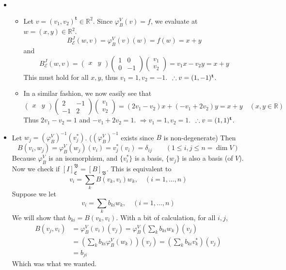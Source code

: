 \documentclass[12pt]{report}
\newcommand{\numl}[1]{\item[\large\textbf{\sffamily #1}]}
\newcommand{\num}[1]{\item[\textbf{\sffamily #1}]}
\newcommand{\mf}[1]{\mathfrak{#1}}
\newcommand{\mc}[1]{\mathcal{#1}}
\newcommand{\bb}[1]{\mathbb{#1}}
\newcommand{\trans}{^{\mathrm{\mathbf{t}}}}
\newcommand{\inv}{^{-1}}
\renewcommand{\inv}{^{-1}}
\begin{document}
\begin{itemize}
\numl{13.8.7}
	\begin{itemize}
		\num{(가)} Let $v = (v_1, v_2)\trans \in \bb{R}^2$. Since $\varphi_B^V(v) = f$, we evaluate at $w = (x, y)\in \bb{R}^2$. $$B_\mc{E}^J(w, v)=\varphi_B^V(v)(w) = f(w) = x+y$$ and $$B_\mc{E}^J(w, v) = \begin{pmatrix}
			x & y
		\end{pmatrix} \begin{pmatrix}
		1 & 0 \\ 0 & -1
		\end{pmatrix} \begin{pmatrix}
		v_1\\v_2
		\end{pmatrix} = v_1x - v_2y = x+ y$$This must hold for all $x, y$, thus $v_1 = 1, v_2 = -1$. $~\hfill \therefore v = (1, -1)\trans$.
		\num{(나)} In a similar fashion, we now easily see that $$\begin{pmatrix}
		x & y
		\end{pmatrix} \begin{pmatrix}
		2 & -1 \\ -1 & 2
		\end{pmatrix} \begin{pmatrix}
		v_1\\v_2
		\end{pmatrix} = (2v_1-v_2)x + (-v_1+2v_2)y = x+ y \quad(x, y\in \bb{R})$$
		Thus $2v_1 -v_2 = 1$ and $-v_1+2v_2=1$. $\Rightarrow v_1 = 1, v_2 = 1$. $~\hfill \therefore v=(1, 1)\trans$.
	\end{itemize}

\numl{13.8.8} Let $w_j = (\varphi_B^V)\inv(v_j^*)$. ($(\varphi_B^V)\inv$ exists since $B$ is non-degenerate) Then $$B(v_i, w_j) = \varphi_B^V(w_j)(v_i) = v_j^*(v_i) = \delta_{ij} \qquad (1\leq i, j\leq n=\dim V)$$ Because $\varphi_B^V$ is an isomorphism, and $\{v_i^*\}$ is a basis, $\{w_j\}$ is also a basis (of $V$). \\Now we check if $\left[I\right]_\mf{C}^\mf{B} = \left[B\right]_{\mf{B}}$. This is equivalent to $$v_i = \sum_k B(v_k, v_i)w_k, \quad (i = 1, \dots, n)$$ Suppose we let $$v_i = \sum_k b_{ki}w_k, \quad (i = 1, \dots, n)$$ We will show that $b_{ki} = B(v_k, v_i)$. With a bit of calculation, for all $i, j$, $$\begin{aligned}B(v_j, v_i) &= \varphi_B^V(v_i)(v_j) = \varphi_B^V\left(\sum_k b_{ki}w_k\right)\left(v_j\right) \\&= \left(\sum_k b_{ki}\varphi_B^V(w_k)\right)(v_j)
= \left(\sum_k b_{ki}v_k^*\right)(v_j) \\ &= b_{ji}\end{aligned}$$ Which was what we wanted.


\end{itemize}
\end{document}
